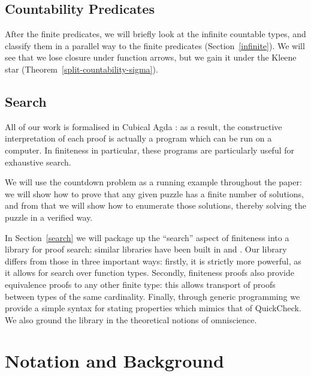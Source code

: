 \subsection{Countability Predicates}
After the finite predicates, we will briefly look at the infinite countable
types, and classify them in a parallel way to the finite predicates
(Section~\ref{infinite}).
We will see that we lose closure under function arrows, but we gain it under the
Kleene star (Theorem~\ref{split-countability-sigma}).
\subsection{Search}
All of our work is formalised in Cubical Agda
\cite{vezzosiCubicalAgdaDependently2019}: as a result, the constructive
interpretation of each proof is actually a program which can be run on a
computer.
In finiteness in particular, these programs are particularly useful for
exhaustive search.

We will use the countdown problem as a running example throughout the paper: we
will show how to prove that any given puzzle has a finite number of solutions,
and from that we will show how to enumerate those solutions, thereby solving the
puzzle in a verified way.

In Section~\ref{search} we will package up the ``search'' aspect of finiteness
into a library for proof search: similar libraries have been built in
\cite{fruminFiniteSetsHomotopy2018} and
\cite{firsovDependentlyTypedProgramming2015}.
Our library differs from those in three important ways: firstly, it is strictly
more powerful, as it allows for search over function types.
Secondly, finiteness proofs also provide equivalence proofs to any other finite
type: this allows transport of proofs between types of the same cardinality.
Finally, through generic programming we provide a simple syntax for stating
properties which mimics that of QuickCheck.
We also ground the library in the theoretical notions of omniscience.
\section{Notation and Background}
